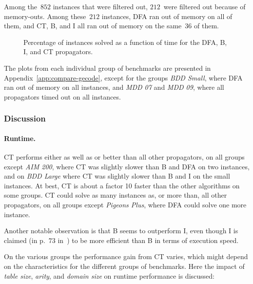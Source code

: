 \documentclass[a4paper,11pt]{article}
\theoremstyle{definition}
\numberwithin{equation}{section}
\begin{document}
Among the~$852$ instances that were filtered out, $212$~were filtered out
because of memory-outs. Among these~$212$ instances, DFA ran out of memory on all of them,
and CT, B, and I all ran out of memory on the same~$36$ of them.

\begin{figure}
  \centering
  \begin{tikzpicture}[every mark/.append style={mark size=4pt}]%
    
  \end{tikzpicture}
  \caption{Percentage of instances solved as a function of time for the DFA, B, I, and CT
    propagators.}
  \label{fig:total}
\end{figure}

The plots from each individual group of benchmarks are presented
in Appendix~\ref{app:compare-gecode},
except for the groups \emph{BDD Small}, where DFA ran out of memory on all instances,
and \emph{MDD 07} and \emph{MDD 09},
where all propagators timed out on all instances.

\subsubsection{Discussion}

\paragraph{Runtime.}
CT performs either as well as or better than all other propagators,
on all groups except \emph{AIM 200}, where CT was slightly slower than B and DFA
on two instances, and on \emph{BDD Large} where CT was slightly
slower than B and I on the small instances. At best, CT is about a factor 10 faster
than the other algorithms on some groups.
CT could solve as many instances as, or more than, all other propagators,
on all groups except \emph{Pigeons Plus}, where DFA could solve one more instance.

Another notable observation is that B seems to outperform I, even though I is claimed
(in p.~$73$ in~\cite{Gecode:MPG}) to be more efficient than B in terms of execution speed.

On the various groups the performance gain from CT varies, which might depend
on the characteristics for the different groups of benchmarks. Here the impact
of \emph{table size}, \emph{arity}, and \emph{domain size} on runtime performance
is discussed:
\end{document}
